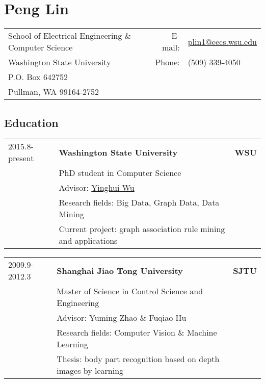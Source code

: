\documentclass[10pt, a4paper]{article}
\author{plin1}
\date{\today}
\title{}
\begin{document}
\pagestyle{empty}
\setlength{\parindent}{0cm}

\sectionfont{
  \huge\bfseries
}

\subsectionfont{
  \sectionrule{0pt}{0pt}{-5pt}{0.8pt}
}

\section*{Peng Lin}
\label{sec-1}
\begin{center}
\begin{tabularx}{\linewidth}{Xrl}
School of Electrical Engineering \& Computer Science & E-mail: & \href{mailto:plin1@eecs.wsu.edu}{plin1@eecs.wsu.edu}\\
Washington State University & Phone: & (509) 339-4050\\
P.O. Box 642752 &  & \\
Pullman, WA 99164-2752 &  & \\
\end{tabularx}
\end{center}

\subsection*{Education}
\label{sec-1-1}
\begin{center}
\begin{tabularx}{\linewidth}{lXr}
2015.8-present & \textbf{Washington State University} & \textbf{WSU}\\
 & PhD student in Computer Science & \\
 & Advisor: \href{http://eecs.wsu.edu/~yinghui/}{Yinghui Wu} & \\
 & Research fields: Big Data, Graph Data, Data Mining & \\
 & Current project: graph association rule mining and applications & \\
\end{tabularx}
\end{center}

\begin{center}
\begin{tabularx}{\linewidth}{lXr}
2009.9-2012.3 & \textbf{Shanghai Jiao Tong University} & \textbf{SJTU}\\
 & Master of Science in Control Science and Engineering & \\
 & Advisor: Yuming Zhao \& Fuqiao Hu & \\
 & Research fields: Computer Vision \& Machine Learning & \\
 & Thesis: body part recognition based on depth images by learning & \\
\end{tabularx}
\end{center}
\end{document}
